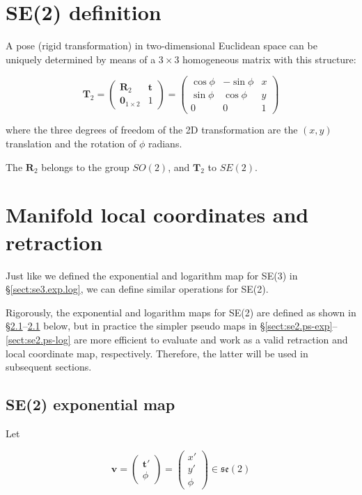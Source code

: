\documentclass[a4paper,11pt]{report}
\begin{document}
\section{SE(2) definition}

A pose (rigid transformation) in two-dimensional Euclidean space can be uniquely determined by means
of a $3 \times 3$ homogeneous matrix with this structure:

\begin{equation}
\label{eq:se2:T_Rt}
 \mathbf{T}_2 =
\left(
\begin{array}{c|c}
  \mathbf{R}_2 & \mathbf{t} \\
\hline
  \mathbf{0}_{1\times 2} & 1
\end{array}
\right)
=
\left(
\begin{array}{cc|c}
\cos \phi & -\sin \phi & x \\
\sin \phi & \cos \phi & y \\
\hline
0 & 0 & 1
\end{array}
\right)
\end{equation}

\noindent where the three degrees of freedom of the 2D transformation are the $(x,y)$ translation
and the rotation of $\phi$ radians.

The $\mathbf{R}_2$ belongs to the group $SO(2)$, and $\mathbf{T}_2$ to $SE(2)$.

\section{Manifold local coordinates and retraction}

Just like we defined the exponential and logarithm map for SE(3) in \S\ref{sect:se3.exp.log},
we can define similar operations for SE(2).

Rigorously, the exponential and logarithm maps for SE(2) 
are defined as shown in \S\ref{sect:se2.exp}--\ref{sect:se2.exp} below, 
but in practice the simpler pseudo maps in \S\ref{sect:se2.ps-exp}--\ref{sect:se2.ps-log}
are more efficient to evaluate and work as a valid retraction and local coordinate map, respectively.
Therefore, the latter will be used in subsequent sections.

\subsection{SE(2) exponential map}
\label{sect:se2.exp}

Let

\begin{equation}
\label{eq:vector_in_se2}
\mathbf{v}= \left( \begin{array}{c} \mathbf{t}' \\ \phi \end{array} \right)
= \left( \begin{array}{c} x' \\ y' \\ \phi \end{array} \right) \in \mathfrak{se}(2)
\end{equation}
\end{document}

